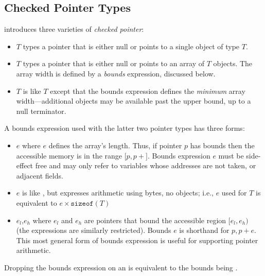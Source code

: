 

\subsection{Checked Pointer Types}
%
\checkedc introduces three varieties of \emph{checked pointer}:
\begin{itemize}
\item {}$T$\code{>} types a pointer that is either null or
  points to a single object of type $T$.
\item {}$T$\code{>} types a pointer that is either null
  or points to an array of $T$ objects. The array width is defined
  by a \emph{bounds} expression, discussed below.
\item {}$T$\code{>} is like
  $T$\code{>} except that the bounds expression
  defines the \emph{minimum} array width---additional objects may
  be available past the upper bound, up to a null terminator.
\end{itemize}
A bounds expression used with the latter two pointer types has three
forms:
\begin{itemize}
\item {}$e$\code{)} where $e$ defines the array's
  length. Thus, if pointer $p$ has bounds  then the
  accessible memory is in the range $[p,p+$$]$. Bounds
  expression $e$ must be side-effect free and may only refer to
  variables whose addresses are not taken, or adjacent 
  fields.
\item {}$e$\code{)} is like , but
  expresses arithmetic using bytes, no objects; i.e.,
  $e$\code{)} used for $T$\code{>} is
  equivalent to $e\times\texttt{sizeof}(T)$\code{)}
\item {}$e_l$,$e_h$\code{)} where $e_l$ and $e_h$ are
  pointers that bound the accessible region $[e_l,e_h)$ (the
  expressions are similarly restricted). Bounds
  $e$\code{)} is shorthand for
  $p, p + e$\code{)}. This most general form of bounds
  expression is useful for supporting pointer arithmetic.
\end{itemize}
  Dropping the bounds expression on an  is equivalent
  to the bounds being .

